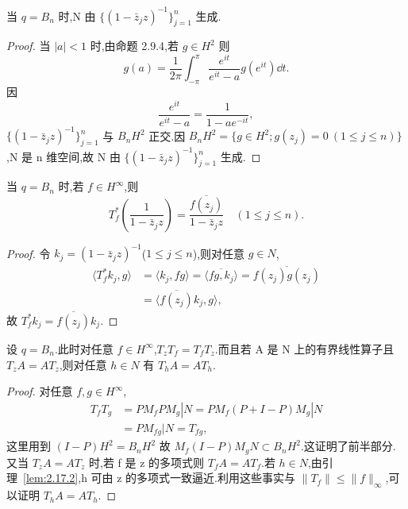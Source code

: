 \begin{lemma}\label{lem:2.17.2}
当 $q = B_{n}$ 时,N 由 $\{(1 - \bar{z}_{j}z)^{-1}\}_{j=1}^{n}$ 生成.
\end{lemma}

\begin{proof}
当 $|a| < 1$ 时,由命题 2.9.4,若 $g \in H^{2}$ 则
\begin{equation*}
g(a) = \frac{1}{2\pi}\int_{-\pi}^{\pi} \frac{e^{it}}{e^{it} - a} g(e^{it})\dd t.
\end{equation*}
因
\begin{equation*}
\frac{e^{it}}{e^{it} - a} = \frac{1}{1 - ae^{-it}},
\end{equation*}
$\{(1 - \bar{z}_{j}z)^{-1}\}_{j=1}^{n}$ 与 $B_{n}H^{2}$ 正交.因 $B_{n}H^{2} = \{g \in H^{2}; g(z_{j}) = 0 \ (1 \leq j \leq n)\}$,N 是 n 维空间,故 N 由 $\{(1 - \bar{z}_{j}z)^{-1}\}_{j=1}^{n}$ 生成.
\end{proof}

\begin{lemma}\label{lem:2.17.3}
当 $q = B_{n}$ 时,若 $f \in H^{\infty}$,则
\begin{equation*}
T_{f}^{*}\left(\frac{1}{1 - \bar{z}_{j}z}\right) = \frac{\overline{f(z_{j})}}{1 - \bar{z}_{j}z} \quad (1 \leq j \leq n).
\end{equation*}
\end{lemma}

\begin{proof}
令 $k_{j} = (1 - \bar{z}_{j}z)^{-1}$($1 \leq j \leq n$),则对任意 $g \in N$,
\begin{align*}
\langle T_{f}^{*}k_{j}, g \rangle & = \langle k_{j}, fg \rangle = \overline{\langle fg, k_{j} \rangle} = \overline{f(z_{j})g(z_{j})} \\
& = \langle \overline{f(z_{j})}k_{j}, g \rangle,
\end{align*}
故 $T_{f}^{*}k_{j} = \overline{f(z_{j})}k_{j}$.
\end{proof}

\begin{lemma}\label{lem:2.17.4}
设 $q = B_{n}$.此时对任意 $f \in H^{\infty}$,$T_{z}T_{f} = T_{f}T_{z}$.而且若 A 是 N 上的有界线性算子且 $T_{z}A = AT_{z}$,则对任意 $h \in N$ 有 $T_{h}A = AT_{h}$.
\end{lemma}

\begin{proof}
对任意 $f, g \in H^{\infty}$,
\begin{align*}
T_{f}T_{g} & = PM_{f}PM_{g}|N = PM_{f}(P + I - P)M_{g}|N \\
& = PM_{fg}|N = T_{fg},
\end{align*}
这里用到 $(I-P)H^{2} = B_{n}H^{2}$ 故 $M_{f}(I-P)M_{g}N \subset B_{n}H^{2}$.这证明了前半部分.又当 $T_{z}A = AT_{z}$ 时,若 f 是 z 的多项式则 $T_{f}A = AT_{f}$.若 $h \in N$,由引理~\ref{lem:2.17.2},h 可由 z 的多项式一致逼近.利用这些事实与 $\|T_{f}\| \leq \|f\|_{\infty}$,可以证明 $T_{h}A = AT_{h}$.
\end{proof}

